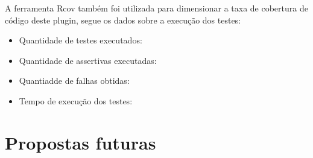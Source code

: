 A ferramenta Rcov também foi utilizada para dimensionar a taxa de cobertura de código deste plugin, segue os dados sobre a execução dos testes:

\begin{itemize}
\item Quantidade de testes executados: 
\item Quantidade de assertivas executadas: 
\item Quantiadde de falhas obtidas: 
\item Tempo de execução dos testes: 
\end{itemize}

\section{Propostas futuras}
